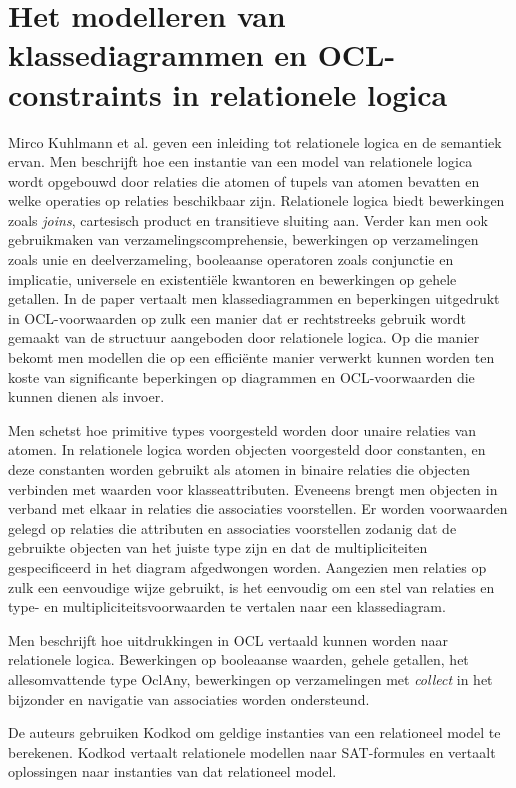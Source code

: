\section{Het modelleren van klassediagrammen en OCL-constraints in relationele logica}
Mirco Kuhlmann et al.\cite{KuhlmannMirco2012FUaO} geven een inleiding tot relationele logica en de semantiek ervan. Men beschrijft hoe een instantie van een model van relationele logica wordt opgebouwd door relaties die atomen of tupels van atomen bevatten en welke operaties op relaties beschikbaar zijn. Relationele logica biedt bewerkingen zoals \textit{joins}, cartesisch product en transitieve sluiting aan. Verder kan men ook gebruikmaken van verzamelingscomprehensie, bewerkingen op verzamelingen zoals unie en deelverzameling, booleaanse operatoren zoals conjunctie en implicatie, universele en existenti\"ele kwantoren en bewerkingen op gehele getallen. In de paper vertaalt men klassediagrammen en beperkingen uitgedrukt in OCL-voorwaarden\cite{WarmerJosB1999Ocl:} op zulk een manier dat er rechtstreeks gebruik wordt gemaakt van de structuur aangeboden door relationele logica. Op die manier bekomt men modellen die op een effici\"ente manier verwerkt kunnen worden ten koste van significante beperkingen op diagrammen en OCL-voorwaarden die kunnen dienen als invoer.

Men schetst hoe primitive types voorgesteld worden door unaire relaties van atomen. In relationele logica worden objecten voorgesteld door constanten, en deze constanten worden gebruikt als atomen in binaire relaties die objecten verbinden met waarden voor klasseattributen. Eveneens brengt men objecten in verband met elkaar in relaties die associaties voorstellen. Er worden voorwaarden gelegd op relaties die attributen en associaties voorstellen zodanig dat de gebruikte objecten van het juiste type zijn en dat de multipliciteiten gespecificeerd in het diagram afgedwongen worden. Aangezien men relaties op zulk een eenvoudige wijze gebruikt, is het eenvoudig om een stel van relaties en type- en multipliciteitsvoorwaarden te vertalen naar een klassediagram.

Men beschrijft hoe uitdrukkingen in OCL vertaald kunnen worden naar relationele logica. Bewerkingen op booleaanse waarden, gehele getallen, het allesomvattende type OclAny\cite{WarmerJosB1999Ocl:}, bewerkingen op verzamelingen met \textit{collect} in het bijzonder en navigatie van associaties worden ondersteund.

De auteurs gebruiken Kodkod\cite{10.1007/978-3-540-71209-1_49} om geldige instanties van een relationeel model te berekenen. Kodkod vertaalt relationele modellen naar SAT-formules en vertaalt oplossingen naar instanties van dat relationeel model.

